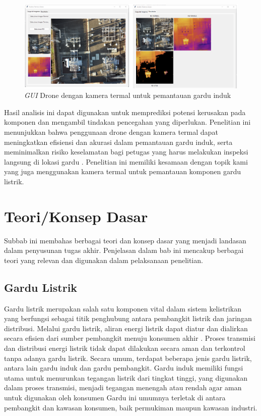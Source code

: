 \begin{figure} [H] \centering
  \includegraphics[scale=0.64]{gambar/bab2/drone.png}
  \caption{\emph{GUI} Drone dengan kamera termal untuk pemantauan gardu induk \cite{Prieto2022}}
  \label{fig:Drone dengan kamera termal untuk pemantauan gardu induk}
\end{figure}

Hasil analisis ini dapat digunakan untuk memprediksi potensi kerusakan pada komponen dan mengambil tindakan pencegahan yang diperlukan. Penelitian ini menunjukkan bahwa penggunaan drone dengan kamera termal dapat meningkatkan efisiensi dan akurasi dalam pemantauan gardu induk, serta meminimalkan risiko keselamatan bagi petugas yang harus melakukan inspeksi langsung di lokasi gardu \cite{Prieto2022}. Penelitian ini memiliki kesamaan dengan topik kami yang juga menggunakan kamera termal untuk pemantauan komponen gardu listrik.

\section{Teori/Konsep Dasar}
Subbab ini membahas berbagai teori dan konsep dasar yang menjadi landasan dalam penyusunan tugas akhir. Penjelasan dalam bab ini mencakup berbagai teori yang relevan dan digunakan dalam pelaksanaan penelitian.

\subsection{Gardu Listrik}
\sloppy
Gardu listrik merupakan salah satu komponen vital dalam sistem kelistrikan yang berfungsi sebagai titik penghubung antara pembangkit listrik dan jaringan distribusi. Melalui gardu listrik, aliran energi listrik dapat diatur dan dialirkan secara efisien dari sumber pembangkit menuju konsumen akhir \cite{stevenson1994power}. Proses transmisi dan distribusi energi listrik tidak dapat dilakukan secara aman dan terkontrol tanpa adanya gardu listrik. Secara umum, terdapat beberapa jenis gardu listrik, antara lain gardu induk dan gardu pembangkit. Gardu induk memiliki fungsi utama untuk menurunkan tegangan listrik dari tingkat tinggi, yang digunakan dalam proses transmisi, menjadi tegangan menengah atau rendah agar aman untuk digunakan oleh konsumen Gardu ini umumnya terletak di antara pembangkit dan kawasan konsumen, baik permukiman maupun kawasan industri.

